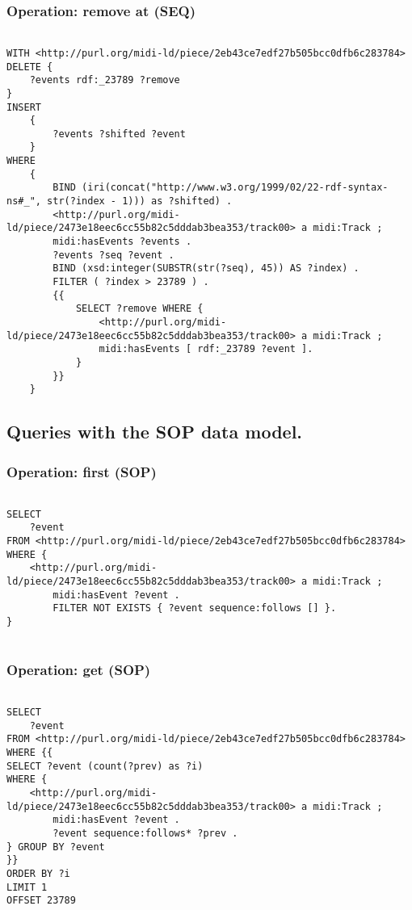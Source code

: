 \subsubsection{Operation: remove at (SEQ)}
\label{query:SEQ:remove_at}

\begin{lstlisting}[language=sparql]

WITH <http://purl.org/midi-ld/piece/2eb43ce7edf27b505bcc0dfb6c283784>
DELETE {
	?events rdf:_23789 ?remove
}
INSERT
	{ 
		?events ?shifted ?event
	}
WHERE 
	{  
		BIND (iri(concat("http://www.w3.org/1999/02/22-rdf-syntax-ns#_", str(?index - 1))) as ?shifted) .
		<http://purl.org/midi-ld/piece/2473e18eec6cc55b82c5dddab3bea353/track00> a midi:Track ;
		midi:hasEvents ?events .
		?events ?seq ?event .
		BIND (xsd:integer(SUBSTR(str(?seq), 45)) AS ?index) .
		FILTER ( ?index > 23789 ) .
		{{
			SELECT ?remove WHERE {
				<http://purl.org/midi-ld/piece/2473e18eec6cc55b82c5dddab3bea353/track00> a midi:Track ;
				midi:hasEvents [ rdf:_23789 ?event ].
			}
		}}
	}

\end{lstlisting}


\subsection{Queries with the SOP data model.}
\label{queries:SOP}

\subsubsection{Operation: first (SOP)}
\label{query:SOP:first}

\begin{lstlisting}[language=sparql]

SELECT
	?event
FROM <http://purl.org/midi-ld/piece/2eb43ce7edf27b505bcc0dfb6c283784>
WHERE {
	<http://purl.org/midi-ld/piece/2473e18eec6cc55b82c5dddab3bea353/track00> a midi:Track ;
		midi:hasEvent ?event .
		FILTER NOT EXISTS { ?event sequence:follows [] }.
} 


\end{lstlisting}

\subsubsection{Operation: get (SOP)}
\label{query:SOP:get}

\begin{lstlisting}[language=sparql]

SELECT
	?event
FROM <http://purl.org/midi-ld/piece/2eb43ce7edf27b505bcc0dfb6c283784>
WHERE {{
SELECT ?event (count(?prev) as ?i)
WHERE {
	<http://purl.org/midi-ld/piece/2473e18eec6cc55b82c5dddab3bea353/track00> a midi:Track ;
		midi:hasEvent ?event .
		?event sequence:follows* ?prev .
} GROUP BY ?event
}}
ORDER BY ?i
LIMIT 1
OFFSET 23789

\end{lstlisting}

